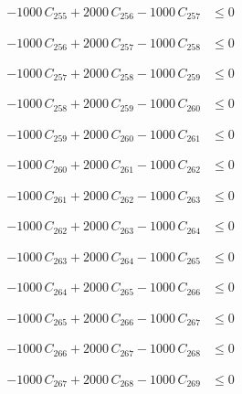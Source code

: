\documentclass[a4paper,11pt]{article}
\begin{document}
\begin{align}
-1000\,C_{255} + 2000\,C_{256} - 1000\,C_{257} &\leq 0 \nonumber
\end{align}

\begin{align}
-1000\,C_{256} + 2000\,C_{257} - 1000\,C_{258} &\leq 0 \nonumber
\end{align}

\begin{align}
-1000\,C_{257} + 2000\,C_{258} - 1000\,C_{259} &\leq 0 \nonumber
\end{align}

\begin{align}
-1000\,C_{258} + 2000\,C_{259} - 1000\,C_{260} &\leq 0 \nonumber
\end{align}

\begin{align}
-1000\,C_{259} + 2000\,C_{260} - 1000\,C_{261} &\leq 0 \nonumber
\end{align}

\begin{align}
-1000\,C_{260} + 2000\,C_{261} - 1000\,C_{262} &\leq 0 \nonumber
\end{align}

\begin{align}
-1000\,C_{261} + 2000\,C_{262} - 1000\,C_{263} &\leq 0 \nonumber
\end{align}

\begin{align}
-1000\,C_{262} + 2000\,C_{263} - 1000\,C_{264} &\leq 0 \nonumber
\end{align}

\begin{align}
-1000\,C_{263} + 2000\,C_{264} - 1000\,C_{265} &\leq 0 \nonumber
\end{align}

\begin{align}
-1000\,C_{264} + 2000\,C_{265} - 1000\,C_{266} &\leq 0 \nonumber
\end{align}

\begin{align}
-1000\,C_{265} + 2000\,C_{266} - 1000\,C_{267} &\leq 0 \nonumber
\end{align}

\begin{align}
-1000\,C_{266} + 2000\,C_{267} - 1000\,C_{268} &\leq 0 \nonumber
\end{align}

\begin{align}
-1000\,C_{267} + 2000\,C_{268} - 1000\,C_{269} &\leq 0 \nonumber
\end{align}
\end{document}
